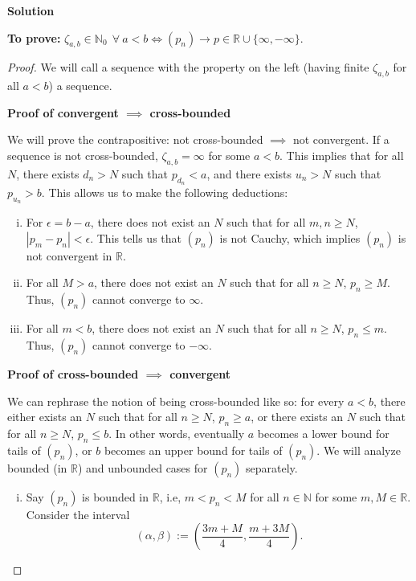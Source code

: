 \documentclass[12pt]{article}
\begin{document}
      {\bf Solution}

      {\bf To prove: } $\zeta_{a, b}\in \mathbb{N}_{0} \ \ \forall \ a<b \iff (p_{n})\to p\in \mathbb{R}\cup \{ \infty, -\infty \}$.


\begin{proof}
      We will call a sequence with the property on the left (having finite $\zeta_{a,b}$ for all $a<b$) a  sequence.

            {\bf Proof of convergent $\implies$ cross-bounded}

      We will prove the contrapositive: not cross-bounded $\implies$ not convergent.
      If a sequence is not cross-bounded, $\zeta_{a, b}=\infty$ for some $a<b$. This implies
      that for all $N$, there exists $d_{n}>N$ such that $p_{d_{n}}<a$,  and there exists $u_{n}>N$
      such that $p_{u_{n}}>b$. This allows us to make the following deductions:
      \begin{enumerate}[(i)]
            \item For $\epsilon=b-a$, there does not exist an $N$ such that for all $m, n\ge N$, $|p_{m}-p_{n}|<\epsilon$.
                  This tells us that $(p_{n})$ is not Cauchy, which implies $(p_{n})$ is not convergent in $\mathbb{R}$.
            \item For all $M>a$, there does not exist an $N$ such that for all $n\geq N$, $p_{n}\geq M$. Thus, $(p_{n})$ cannot converge to $\infty$.
            \item For all $m < b$, there does not exist an $N$ such that for all $n\geq N$, $p_{n}\leq m$. Thus, $(p_{n})$ cannot converge to $-\infty$.
      \end{enumerate}

      {\bf Proof of cross-bounded $\implies$ convergent}

      We can rephrase the notion of being cross-bounded like so: for every $a<b$, there
      either exists an $N$ such that for all $n\geq N$,  $p_{n}\ge a$, or there exists
      an $N$ such that for all $n\ge N$, $p_{n}\leq b$. In other words, eventually $a$
      becomes a lower bound for tails of $(p_n)$, or $b$ becomes an upper bound
      for tails of $(p_n)$. We will analyze bounded (in $\mathbb{R}$) and unbounded
      cases for $(p_{n})$ separately.
      \begin{enumerate}[(i)]
            \item Say $(p_{n})$ is bounded in $\mathbb{R}$, i.e, $m<p_{n}<M$ for all
                  $n\in \mathbb{N}$ for some $m, M\in \mathbb{R}$. Consider the interval
                  $$
                        (\alpha, \beta):=\left(\frac{{3m+M}}{4}, \frac{{m+3M}}{4}\right).
                  $$


\end{enumerate}
\end{proof}
\end{document}
